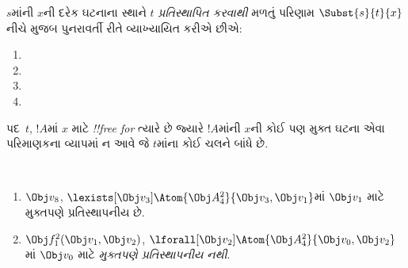 \documentclass[../../../include/open-logic-section]{subfiles}
\begin{document}


\begin{defn}[પદમાં પ્રતિસ્થાપન]
$s$માંની $x$ની દરેક ઘટનાના સ્થાને $t$ \emph{પ્રતિસ્થાપિત કરવાથી}
મળતું પરિણામ $\Subst{s}{t}{x}$ નીચે મુજબ પુનરાવર્તી રીતે વ્યાખ્યાયિત
કરીએ છીએ:
\begin{enumerate}
\item {}

\item {}

\item {}

\item{}
\end{enumerate}
\end{defn}

\begin{defn}
પદ~$t$, $!A$માં $x$ માટે \emph{!!{free for}} ત્યારે છે જ્યારે
$!A$માંની $x$ની કોઈ પણ મુક્ત ઘટના એવા પરિમાણકના વ્યાપમાં ન આવે જે
$t$માંના કોઈ ચલને બાંધે છે.
\end{defn}

\begin{ex} ~
\begin{enumerate}
\item $\Obj v_8$, $\lexists[\Obj
  v_3]\Atom{\Obj A^2_4}{\Obj v_3,\Obj v_1}$માં $\Obj v_1$ માટે
  મુક્તપણે પ્રતિસ્થાપનીય છે.

\item $\Obj f^2_1(\Obj v_1, \Obj v_2)$,
  $\lforall[\Obj v_2]\Atom{\Obj A^2_4}{\Obj v_0,\Obj v_2}$માં
  $\Obj v_0$ માટે \emph{મુક્તપણે પ્રતિસ્થાપનીય નથી}.
\end{enumerate}
\end{ex}
\end{document}
